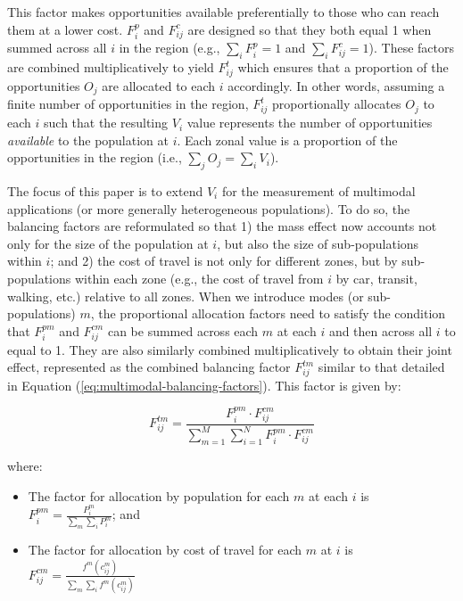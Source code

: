 \documentclass[10pt,letterpaper]{article}
\providecommand{\tightlist}{%
  \setlength{\itemsep}{0pt}\setlength{\parskip}{0pt}}
\begin{document}
This factor makes opportunities available preferentially to those who
can reach them at a lower cost. \(F^p_{i}\) and \(F^c_{ij}\) are
designed so that they both equal 1 when summed across all \(i\) in the
region (e.g., \(\sum_i F^p_{i} = 1\) and \(\sum_i F^c_{ij} = 1\)). These
factors are combined multiplicatively to yield \(F^t_{ij}\) which
ensures that a proportion of the opportunities \(O_j\) are allocated to
each \(i\) accordingly. In other words, assuming a finite number of
opportunities in the region, \(F^t_{ij}\) proportionally allocates
\(O_j\) to each \(i\) such that the resulting \(V_i\) value represents
the number of opportunities \emph{available} to the population at \(i\).
Each zonal value is a proportion of the opportunities in the region
(i.e., \(\sum_j O_j = \sum_i V_i\)).

The focus of this paper is to extend \(V_i\) for the measurement of
multimodal applications (or more generally heterogeneous populations).
To do so, the balancing factors are reformulated so that 1) the mass
effect now accounts not only for the size of the population at \(i\),
but also the size of sub-populations within \(i\); and 2) the cost of
travel is not only for different zones, but by sub-populations within
each zone (e.g., the cost of travel from \(i\) by car, transit, walking,
etc.) relative to all zones. When we introduce modes (or
sub-populations) \(m\), the proportional allocation factors need to
satisfy the condition that \(F^{pm}_{i}\) and \(F^{cm}_{ij}\) can be
summed across each \(m\) at each \(i\) and then across all \(i\) to
equal to 1. They are also similarly combined multiplicatively to obtain
their joint effect, represented as the combined balancing factor
\(F^{tm}_{ij}\) similar to that detailed in Equation
(\ref{eq:multimodal-balancing-factors}). This factor is given by:

\begin{equation}
\label{eq:multimodal-balancing-factors}
F^{tm}_{ij} = \frac{F^{pm}_{i} \cdot F^{cm}_{ij}}{\sum_{m=1}^M \sum_{i=1}^N F^{pm}_{i} \cdot F^{cm}_{ij}}
\end{equation}

\noindent where:

\begin{itemize}
\tightlist
\item
  The factor for allocation by population for each \(m\) at each \(i\)
  is \(F^{pm}_{i} = \frac{P_{i}^m}{\sum_{m}\sum_{i} P_{i}^m}\); and
\item
  The factor for allocation by cost of travel for each \(m\) at \(i\) is
  \(F_{ij}^{cm} = \frac{f^m(c_{ij}^m)}{\sum_{m} \sum_{i} f^m(c_{ij}^m)}\)
\end{itemize}
\end{document}
